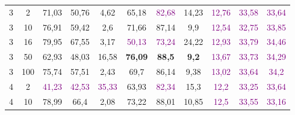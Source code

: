 \begin{table}[ht]
\begin{tabular}{cc|ccc|ccc|ccc}
        {3}                           & {2}    & {71,03}                             & {50,76}                             & {4,62}                                   & {65,18}                   & \textcolor{purple}{82,68} & {14,23}                   & \textcolor{purple}{12,76} & \textcolor{purple}{33,58} & \textcolor{purple}{33,64} \\
        {3}                           & {10}   & {76,91}                             & {59,42}                             & {2,6}                                    & {71,66}                   & {87,14}                   & {9,9}                     & \textcolor{purple}{12,54} & \textcolor{purple}{32,75} & \textcolor{purple}{33,85} \\
        {3}                           & {16}   & {79,95}                             & {67,55}                             & {3,17}                                   & \textcolor{purple}{50,13} & \textcolor{purple}{73,24} & {24,22}                   & \textcolor{purple}{12,93} & \textcolor{purple}{33,79} & \textcolor{purple}{34,46} \\
        {3}                           & {50}   & {62,93}                             & {48,03}                             & {16,58}                                  & {\textbf{76,09}}          & {\textbf{88,5}}           & \textbf{9,2}              & \textcolor{purple}{13,67} & \textcolor{purple}{33,73} & \textcolor{purple}{34,29} \\
        {3}                           & {100}  & {75,74}                             & {57,51}                             & {2,43}                                   & {69,7}                    & {86,14}                   & {9,38}                    & \textcolor{purple}{13,02} & \textcolor{purple}{33,64} & \textcolor{purple}{34,2}  \\
        {4}                           & {2}    & \textcolor{purple}{41,23}           & \textcolor{purple}{42,53}           & \textcolor{purple}{35,33}                & {63,93}                   & \textcolor{purple}{82,34} & {15,3}                    & \textcolor{purple}{12,2}  & \textcolor{purple}{33,25} & \textcolor{purple}{33,64} \\
        {4}                           & {10}   & {78,99}                             & {66,4}                              & {2,08}                                   & {73,22}                   & {88,01}                   & {10,85}                   & \textcolor{purple}{12,5}  & \textcolor{purple}{33,55} & \textcolor{purple}{33,16} \\

\end{tabular}
\end{table}

